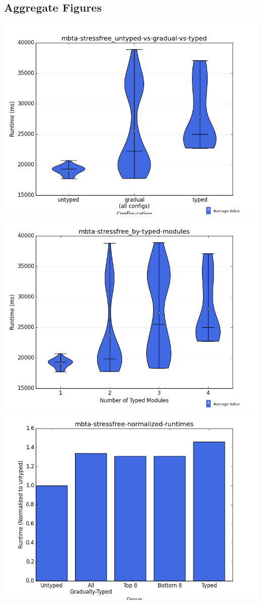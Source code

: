 \documentclass{article}
\begin{document}
\subsection{Aggregate Figures}
\includegraphics[width=\textwidth]{mbta-stressfree_untyped-vs-gradual-vs-typed-violin.png}
\includegraphics[width=\textwidth]{mbta-stressfree_by-typed-modules-violin.png}
\includegraphics[width=\textwidth]{mbta-stressfree-normalized-runtimes-bar.png}
\end{document}
